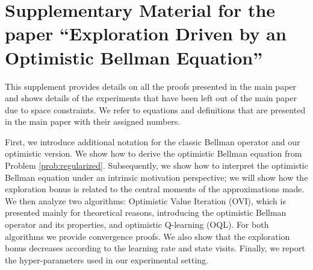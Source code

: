 





\pagebreak
\appendix
\onecolumn
\section{Supplementary Material for the paper ``Exploration Driven by an Optimistic Bellman Equation''}
This supplement provides details on all the proofs presented in the main paper and shows details of the
experiments that have been left out of the main paper due to space constraints. 
We refer to equations and definitions that are presented in the main paper with their assigned numbers.

First, we introduce additional notation for the classic Bellman operator and our optimistic version. 
We show how to derive the optimistic Bellman equation from Problem \ref{prob:regularized}.
Subsequently, we show how to interpret the optimistic Bellman equation under an intrinsic
motivation perspective; we will show how the exploration bonus is related to the central
moments of the approximations made.
We then analyze two algorithms: Optimistic Value Iteration (OVI), which is presented mainly for theoretical reasons, introducing the optimistic Bellman operator and its properties, and optimistic Q-learning (OQL). For both algorithms we provide convergence proofs.
We also show that the exploration bonus decreases according to the learning rate and state visits.
Finally, we report the hyper-parameters used in our experimental setting. 

